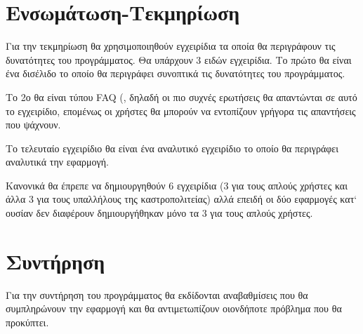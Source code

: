 \documentclass{assignment}
\begin{document}

\section{Ενσωμάτωση-Τεκμηρίωση}

Για την τεκμηρίωση θα χρησιμοποιηθούν εγχειρίδια τα οποία θα περιγράφουν τις δυνατότητες του προγράμματος. Θα υπάρχουν 3 ειδών εγχειρίδια. Το πρώτο θα είναι ένα δισέλιδο το οποίο θα περιγράφει συνοπτικά τις δυνατότητες του προγράμματος.

Το 2ο θα είναι τύπου FAQ (, δηλαδή οι πιο συχνές ερωτήσεις θα απαντώνται σε αυτό το εγχειρίδιο, επομένως οι χρήστες θα μπορούν να εντοπίζουν γρήγορα τις απαντήσεις που ψάχνουν.

Το τελευταίο εγχειρίδιο θα είναι ένα αναλυτικό εγχειρίδιο το οποίο θα περιγράφει αναλυτικά την εφαρμογή.

Κανονικά θα έπρεπε να δημιουργηθούν 6 εγχειρίδια (3 για τους απλούς χρήστες και άλλα 3 για τους υπαλλήλους της καστροπολιτείας) αλλά επειδή οι δύο εφαρμογές κατ` ουσίαν δεν διαφέρουν δημιουργήθηκαν μόνο τα 3 για τους απλούς χρήστες.


\section{Συντήρηση}

Για την συντήρηση του προγράμματος θα εκδίδονται αναβαθμίσεις που θα συμπληρώνουν την εφαρμογή και θα αντιμετωπίζουν οιονδήποτε πρόβλημα που θα προκύπτει.

 \label{Βιβλιογραφία}



\newpage
\end{document}
